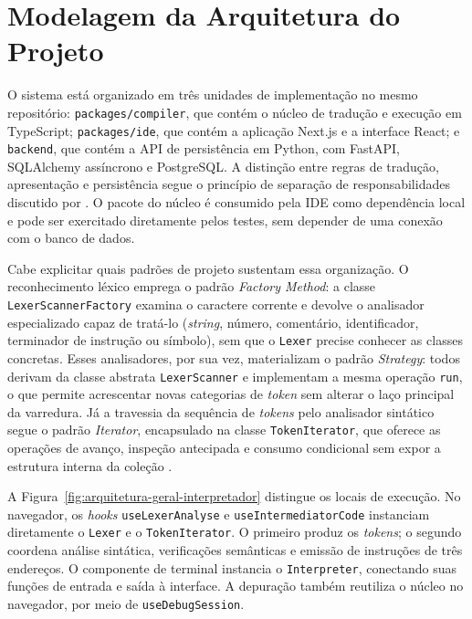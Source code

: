 \section{Modelagem da Arquitetura do Projeto}
\label{sec:modelagem-arquitetura}

O sistema está organizado em três unidades de implementação no mesmo repositório: \texttt{packages/compiler}, que contém o núcleo de tradução e execução em TypeScript; \texttt{packages/ide}, que contém a aplicação Next.js e a interface React; e \texttt{backend}, que contém a API de persistência em Python, com FastAPI, SQLAlchemy assíncrono e PostgreSQL. A distinção entre regras de tradução, apresentação e persistência segue o princípio de separação de responsabilidades discutido por . O pacote do núcleo é consumido pela IDE como dependência local e pode ser exercitado diretamente pelos testes, sem depender de uma conexão com o banco de dados.

Cabe explicitar quais padrões de projeto sustentam essa organização. O reconhecimento léxico emprega o padrão \textit{Factory Method}: a classe \texttt{LexerScannerFactory} examina o caractere corrente e devolve o analisador especializado capaz de tratá-lo (\textit{string}, número, comentário, identificador, terminador de instrução ou símbolo), sem que o \texttt{Lexer} precise conhecer as classes concretas. Esses analisadores, por sua vez, materializam o padrão \textit{Strategy}: todos derivam da classe abstrata \texttt{LexerScanner} e implementam a mesma operação \texttt{run}, o que permite acrescentar novas categorias de \textit{token} sem alterar o laço principal da varredura. Já a travessia da sequência de \textit{tokens} pelo analisador sintático segue o padrão \textit{Iterator}, encapsulado na classe \texttt{TokenIterator}, que oferece as operações de avanço, inspeção antecipada e consumo condicional sem expor a estrutura interna da coleção \cite{martin_clean}.

A Figura~\ref{fig:arquitetura-geral-interpretador} distingue os locais de execução. No navegador, os \textit{hooks} \texttt{useLexerAnalyse} e \texttt{useIntermediatorCode} instanciam diretamente o \texttt{Lexer} e o \texttt{TokenIterator}. O primeiro produz os \textit{tokens}; o segundo coordena análise sintática, verificações semânticas e emissão de instruções de três endereços. O componente de terminal instancia o \texttt{Interpreter}, conectando suas funções de entrada e saída à interface. A depuração também reutiliza o núcleo no navegador, por meio de \texttt{useDebugSession}.

